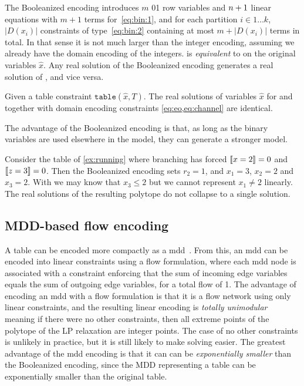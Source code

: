 \documentclass[a4paper,UKenglish,cleveref,autoref,thm-restate]{lipics-v2021}
\begin{document}
The Booleanized encoding introduces $m$ 01 row variables
and $n+1$ linear equations with $m+1$ terms for~\cref{eq:bin:1}, and for each partition $i \in 1 \dots k$, $|D(x_i)|$ constraints of type~\cref{eq:bin:2} containing at most $m + |D(x_i)|$ terms in total. In that sense it is not much larger than the integer encoding, assuming we already have the domain encoding of the integers.
\baseBool is \emph{equivalent} to \baseGleb  on the original variables $\hat{x}$.
Any real solution of the Booleanized encoding generates a real solution of \baseGleb, and vice versa.

\begin{theorem}
    Given a table constraint $\texttt{table}(\hat{x},T)$.
    The real solutions of variables $\hat{x}$ for \baseGleb and 
    \baseBool together with domain encoding constraints \cref{eq:eo,eq:channel} are identical.
\end{theorem}

The advantage of the Booleanized encoding is that, as long as the binary variables are used elsewhere in the model, they can generate a stronger model.
\begin{example}
  Consider the table of \cref{ex:running} where branching has forced $\be{1}{2}  = 0$ and
  $\be{3}{3} = 0$. Then the Booleanized 
  encoding sets $r_2 = 1$, and
  $x_1 = 3$, $x_2 = 2$ and $x_3 = 2$.
  With \baseGleb we may know that $x_3 \leq 2$ but we cannot represent $x_1 \neq 2$ linearly. The real solutions of the resulting polytope do not collapse to a single solution.
\end{example}

\subsection{MDD-based flow encoding}
\label{sec:encoding:mdd}

A table can be encoded more compactly as a \gls{mdd}~\cite{DBLP:journals/constraints/ChengY10}.
From this, an \gls{mdd} can be encoded into linear constraints using a flow formulation, where each \gls{mdd} node is associated with a constraint enforcing that the sum of incoming edge variables equals the sum of outgoing edge variables, for a total flow of 1.
The advantage of encoding an \gls{mdd} with a flow formulation is that it is a flow network using only linear constraints, and the resulting linear encoding is \emph{totally unimodular}~\cite{ahuja1993network} meaning if there were no other constraints, then all extreme points of the polytope of the LP relaxation are integer points.
The case of no other constraints is unlikely in practice, but it is still likely to make \milp solving easier.
The greatest advantage of the \gls{mdd} encoding is that it can can be \emph{exponentially smaller} than the Booleanized encoding, 
since the MDD representing a table can be exponentially smaller than the original table.
\end{document}
